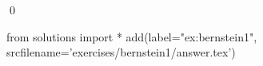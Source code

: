 
\begin{ex} 
  \label{ex:bernstein1}
  
  \qed
\end{ex} 
\begin{python0}
from solutions import *
add(label="ex:bernstein1",
    srcfilename='exercises/bernstein1/answer.tex') 
\end{python0}
